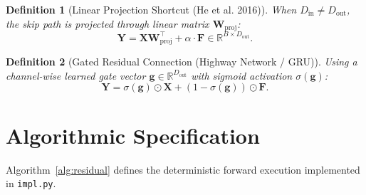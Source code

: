 \documentclass[11pt]{article}
\newtheorem{definition}{Definition}
\begin{document}
\begin{definition}[Linear Projection Shortcut (He et al. 2016)]
When $D_{\text{in}} \ne D_{\text{out}}$, the skip path is projected through linear matrix $\mathbf{W}_{\text{proj}}$:
\begin{equation}
\label{eq:proj_shortcut}
\mathbf{Y} = \mathbf{X} \mathbf{W}_{\text{proj}}^\top + \alpha \cdot \mathbf{F} \in \mathbb{R}^{B \times D_{\text{out}}}.
\end{equation}
\end{definition}

\begin{definition}[Gated Residual Connection (Highway Network / GRU)]
Using a channel-wise learned gate vector $\mathbf{g} \in \mathbb{R}^{D_{\text{out}}}$ with sigmoid activation $\sigma(\mathbf{g})$:
\begin{equation}
\label{eq:gated_res}
\mathbf{Y} = \sigma(\mathbf{g}) \odot \mathbf{X} + (1 - \sigma(\mathbf{g})) \odot \mathbf{F}.
\end{equation}
\end{definition}

\section{Algorithmic Specification}
\label{sec:algorithm}

Algorithm~\ref{alg:residual} defines the deterministic forward execution implemented in \texttt{impl.py}.
\end{document}
